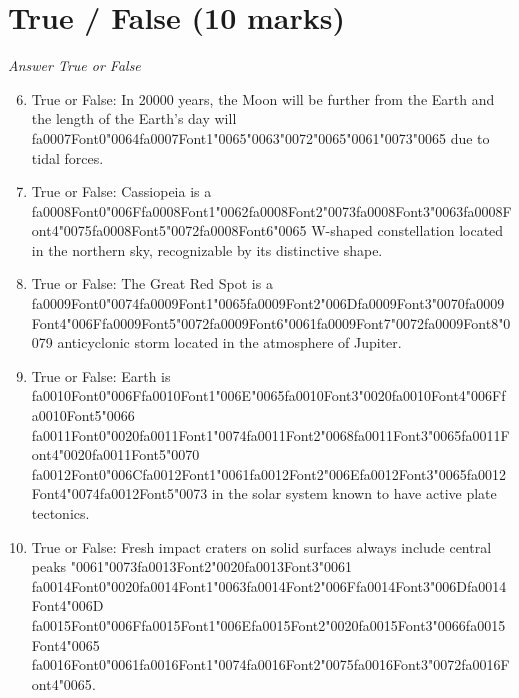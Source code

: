 \documentclass[12pt]{article}
\begin{document}
\section*{True / False (10 marks)}
\textit{Answer True or False}
\begin{enumerate}[label=\arabic*.]
\setcounter{enumi}{5}
\item True or False: In 20000 years, the Moon will be further from the Earth and the length of the Earth's day will {\csname fa0007Font0\endcsname\char"0064}{\csname fa0007Font1\endcsname\char"0065}{\char"0063}{\char"0072}{\char"0065}{\char"0061}{\char"0073}{\char"0065} due to tidal forces.
\item True or False: Cassiopeia is a {\csname fa0008Font0\endcsname\char"006F}{\csname fa0008Font1\endcsname\char"0062}{\csname fa0008Font2\endcsname\char"0073}{\csname fa0008Font3\endcsname\char"0063}{\csname fa0008Font4\endcsname\char"0075}{\csname fa0008Font5\endcsname\char"0072}{\csname fa0008Font6\endcsname\char"0065} W-shaped constellation located in the northern sky, recognizable by its distinctive shape.
\item True or False: The Great Red Spot is a {\csname fa0009Font0\endcsname\char"0074}{\csname fa0009Font1\endcsname\char"0065}{\csname fa0009Font2\endcsname\char"006D}{\csname fa0009Font3\endcsname\char"0070}{\csname fa0009Font4\endcsname\char"006F}{\csname fa0009Font5\endcsname\char"0072}{\csname fa0009Font6\endcsname\char"0061}{\csname fa0009Font7\endcsname\char"0072}{\csname fa0009Font8\endcsname\char"0079} anticyclonic storm located in the atmosphere of Jupiter.
\item True or False: Earth is {\csname fa0010Font0\endcsname\char"006F}{\csname fa0010Font1\endcsname\char"006E}{\char"0065}{\csname fa0010Font3\endcsname\char"0020}{\csname fa0010Font4\endcsname\char"006F}{\csname fa0010Font5\endcsname\char"0066} {\csname fa0011Font0\endcsname\char"0020}{\csname fa0011Font1\endcsname\char"0074}{\csname fa0011Font2\endcsname\char"0068}{\csname fa0011Font3\endcsname\char"0065}{\csname fa0011Font4\endcsname\char"0020}{\csname fa0011Font5\endcsname\char"0070} {\csname fa0012Font0\endcsname\char"006C}{\csname fa0012Font1\endcsname\char"0061}{\csname fa0012Font2\endcsname\char"006E}{\csname fa0012Font3\endcsname\char"0065}{\csname fa0012Font4\endcsname\char"0074}{\csname fa0012Font5\endcsname\char"0073} in the solar system known to have active plate tectonics.
\item True or False: Fresh impact craters on solid surfaces always include central peaks {\char"0061}{\char"0073}{\csname fa0013Font2\endcsname\char"0020}{\csname fa0013Font3\endcsname\char"0061} {\csname fa0014Font0\endcsname\char"0020}{\csname fa0014Font1\endcsname\char"0063}{\csname fa0014Font2\endcsname\char"006F}{\csname fa0014Font3\endcsname\char"006D}{\csname fa0014Font4\endcsname\char"006D} {\csname fa0015Font0\endcsname\char"006F}{\csname fa0015Font1\endcsname\char"006E}{\csname fa0015Font2\endcsname\char"0020}{\csname fa0015Font3\endcsname\char"0066}{\csname fa0015Font4\endcsname\char"0065} {\csname fa0016Font0\endcsname\char"0061}{\csname fa0016Font1\endcsname\char"0074}{\csname fa0016Font2\endcsname\char"0075}{\csname fa0016Font3\endcsname\char"0072}{\csname fa0016Font4\endcsname\char"0065}.

\end{enumerate}
\end{document}
